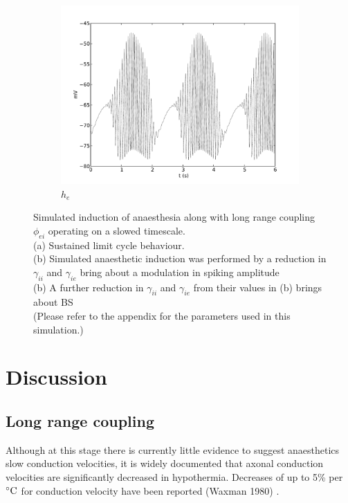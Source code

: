 \documentclass[a4paper,12pt]{article}
\begin{document}
\begin{figure}
\begin{subfigure}[b]{0.5\textwidth}
		\includegraphics[scale=0.32]{frontiers-2012-images-revised/effect_gamma_ee_yml-00416_ode-phi-burst_yml-phi-mod-0_7-2-1-_yml-he-phi.pdf}
		\caption{$h_e$}
	\end{subfigure}

	\label{fig:phi_fast_var}
	\caption{Simulated induction of anaesthesia along with long range coupling $\phi_{ei}$ operating on a slowed timescale.\\
	(a) Sustained limit cycle behaviour.\\
           (b) Simulated anaesthetic induction was performed by a reduction in $\gamma_{ii}$ and $\gamma_{ie}$ bring about a modulation in spiking amplitude\\
           (b) A further reduction in $\gamma_{ii}$ and $\gamma_{ie}$ from their values in (b) brings about BS\\
	(Please refer to the appendix for the parameters used in this simulation.)}
\end{figure}


\section{Discussion}

\subsection{Long range coupling}
Although at this stage there is currently little evidence to suggest anaesthetics slow conduction velocities, it is
widely documented that axonal conduction velocities are significantly decreased in hypothermia. Decreases of up to 5\%
per $^{\circ}{\rm C}$ for conduction velocity have been reported (Waxman 1980) .
\end{document}
